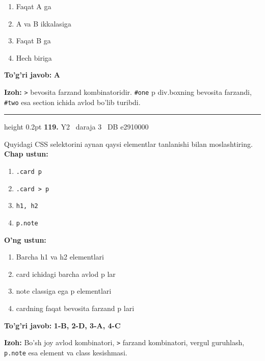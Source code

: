 \documentclass[10pt,a4paper,oneside]{article}
\begin{document}
\begin{enumerate}[label=\Alph*),leftmargin=9mm]
\item Faqat A ga
\item A va B ikkalasiga
\item Faqat B ga
\item Hech biriga
\end{enumerate}
\begin{tcolorbox}[enhanced,breakable,colback=teal!4,colframe=teal!45!black,boxrule=0.45pt,arc=1.2mm,left=2.8mm,right=2.8mm,top=2mm,bottom=2mm,before skip=2mm,after skip=2mm]
\textbf{\color{teal}To'g'ri javob:} \textbf{A}
\par\smallskip
\textbf{Izoh:} \texttt{\textgreater{}} bevosita farzand kombinatoridir. \texttt{\#one} p div.boxning bevosita farzandi, \texttt{\#two} esa section ichida avlod bo'lib turibdi.
\end{tcolorbox}
\vspace{2mm}\hrule height 0.2pt \vspace{4mm}
\hypertarget{q119}{\textbf{\color{ink}119.}}  {\color{muted}\scriptsize Y2 \textbullet\ daraja 3 \textbullet\ DB e2910000}
\par
Quyidagi CSS selektorini aynan qaysi elementlar tanlanishi bilan moslashtiring.
\textbf{\footnotesize Chap ustun:}
\begin{enumerate}[label=\arabic*),leftmargin=9mm]
\item \texttt{.card p}
\item \texttt{.card \textgreater{} p}
\item \texttt{h1, h2}
\item \texttt{p.note}
\end{enumerate}
\textbf{\footnotesize O'ng ustun:}
\begin{enumerate}[label=\Alph*),leftmargin=9mm]
\item Barcha h1 va h2 elementlari
\item card ichidagi barcha avlod p lar
\item note classiga ega p elementlari
\item cardning faqat bevosita farzand p lari
\end{enumerate}
\begin{tcolorbox}[enhanced,breakable,colback=teal!4,colframe=teal!45!black,boxrule=0.45pt,arc=1.2mm,left=2.8mm,right=2.8mm,top=2mm,bottom=2mm,before skip=2mm,after skip=2mm]
\textbf{\color{teal}To'g'ri javob:} \textbf{1-B, 2-D, 3-A, 4-C}
\par\smallskip
\textbf{Izoh:} Bo'sh joy avlod kombinatori, \texttt{\textgreater{}} farzand kombinatori, vergul guruhlash, \texttt{p.note} esa element va class kesishmasi.
\end{tcolorbox}
\end{document}
